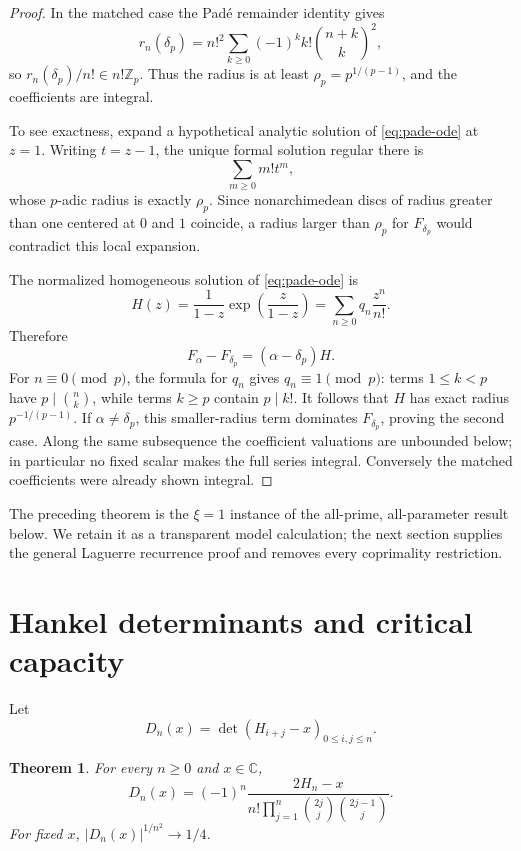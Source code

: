 \documentclass[11pt]{article}
\newtheorem{theorem}{Theorem}[section]
\theoremstyle{definition}
\theoremstyle{remark}
\newcommand{\C}{\mathbb C}
\newcommand{\Z}{\mathbb Z}
\begin{document}
\begin{proof}
In the matched case the Pad\'e remainder identity gives
\[
 r_n(\delta_p)
 =n!^2\sum_{k\ge0}(-1)^kk!\binom{n+k}{k}^2,
\]
so \(r_n(\delta_p)/n!\in n!\Z_p\).  Thus the radius is at least
\(\rho_p=p^{1/(p-1)}\), and the coefficients are integral.

To see exactness, expand a hypothetical analytic solution of
\eqref{eq:pade-ode} at \(z=1\).  Writing \(t=z-1\), the unique formal
solution regular there is
\[
 \sum_{m\ge0}m!t^m,
\]
whose \(p\)-adic radius is exactly \(\rho_p\).  Since nonarchimedean discs of
radius greater than one centered at \(0\) and \(1\) coincide, a radius larger
than \(\rho_p\) for \(F_{\delta_p}\) would contradict this local expansion.

The normalized homogeneous solution of \eqref{eq:pade-ode} is
\begin{equation}\label{eq:homogeneous}
 H(z)=\frac{1}{1-z}\exp\left(\frac{z}{1-z}\right)
 =\sum_{n\ge0}q_n\frac{z^n}{n!}.
\end{equation}
Therefore
\[
 F_\alpha-F_{\delta_p}=(\alpha-\delta_p)H.
\]
For \(n\equiv0\pmod p\), the formula for \(q_n\) gives
\(q_n\equiv1\pmod p\): terms \(1\le k<p\) have
\(p\mid\binom nk\), while terms \(k\ge p\) contain \(p\mid k!\).
It follows that \(H\) has exact radius \(p^{-1/(p-1)}\).  If
\(\alpha\ne\delta_p\), this smaller-radius term dominates
\(F_{\delta_p}\), proving the second case.  Along the same subsequence the
coefficient valuations are unbounded below; in particular no fixed scalar
makes the full series integral.  Conversely the matched coefficients were
already shown integral.
\end{proof}

The preceding theorem is the \(\xi=1\) instance of the all-prime,
all-parameter result below.  We retain it as a transparent model calculation;
the next section supplies the general Laguerre recurrence proof and removes
every coprimality restriction.





\section{Hankel determinants and critical capacity}

Let
\[
 D_n(x)=\det(H_{i+j}-x)_{0\le i,j\le n}.
\]

\begin{theorem}\label{thm:hankel}
For every \(n\ge0\) and \(x\in\C\),
\[
 D_n(x)=(-1)^n\frac{2H_n-x}
 {n!\displaystyle\prod_{j=1}^n\binom{2j}{j}\binom{2j-1}{j}}.
\]
For fixed \(x\), \( |D_n(x)|^{1/n^2}\to1/4\).
\end{theorem}
\end{document}
